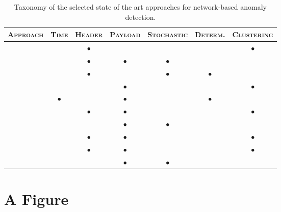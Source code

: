 \clearpage
\begin{table}
\renewcommand{\arraystretch}{1.5} \centering
\begin{tabular}{rcccccc}
\toprule \textsc{Approach} & \textsc{Time} & \textsc{Header} &
\textsc{Payload} & \textsc{Stochastic} & \textsc{Determ.} & \textsc{Clustering}\\
\midrule \citep{phad} & & $\bullet$ & & & & $\bullet$ \\
\citep{kruegel:sac2002:anomaly} & & $\bullet$ & $\bullet$ & $\bullet$ & & \\
\citep{protocolanom} & & $\bullet$ & & $\bullet$ & $\bullet$ & \\
\citep{ramadas} & & & $\bullet$ & & & $\bullet$ \\
\citep{rules-payl} & $\bullet$ & & $\bullet$ & & $\bullet$ & \\
\citep{zanero-savaresi} & & $\bullet$ & $\bullet$ & & & $\bullet$ \\
\citep{wang:raid2004:payl} & & & $\bullet$ & $\bullet$ & & \\
\citep{zanero-pattern} & & $\bullet$ & $\bullet$ & & & $\bullet$ \\
\citep{DBLP:conf/iwia/BolzoniEHZ06} & & $\bullet$ & $\bullet$ & & & $\bullet$ \\
\citep{wang:raid2006:anagram} & & & $\bullet$ & $\bullet$ & & \\
\bottomrule
\end{tabular}
\caption{Taxonomy of the selected state of the art approaches for network-based anomaly detection.}
\label{tab:network-sota-taxonomy}
\end{table}
\clearpage


\section{A Figure}

